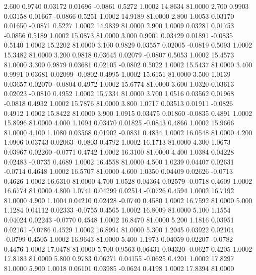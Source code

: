    2.600   0.9740   0.03172   0.01696  -0.0861   0.5272   1.0002  14.8634  81.0000
   2.700   0.9903   0.03158   0.01667  -0.0866   0.5251   1.0002  14.9189  81.0000
   2.800   1.0053   0.03170   0.01650  -0.0871   0.5227   1.0002  14.9839  81.0000
   2.900   1.0009   0.03281   0.01753  -0.0856   0.5189   1.0002  15.0873  81.0000
   3.000   0.9901   0.03429   0.01891  -0.0835   0.5140   1.0002  15.2202  81.0000
   3.100   0.9829   0.03557   0.02005  -0.0819   0.5093   1.0002  15.3482  81.0000
   3.200   0.9818   0.03645   0.02079  -0.0807   0.5053   1.0002  15.4573  81.0000
   3.300   0.9879   0.03681   0.02105  -0.0802   0.5022   1.0002  15.5437  81.0000
   3.400   0.9991   0.03681   0.02099  -0.0802   0.4995   1.0002  15.6151  81.0000
   3.500   1.0139   0.03657   0.02070  -0.0804   0.4972   1.0002  15.6774  81.0000
   3.600   1.0320   0.03613   0.02023  -0.0810   0.4952   1.0002  15.7334  81.0000
   3.700   1.0516   0.03562   0.01968  -0.0818   0.4932   1.0002  15.7876  81.0000
   3.800   1.0717   0.03513   0.01911  -0.0826   0.4912   1.0002  15.8422  81.0000
   3.900   1.0915   0.03475   0.01860  -0.0835   0.4891   1.0002  15.8996  81.0000
   4.000   1.1094   0.03470   0.01825  -0.0843   0.4866   1.0002  15.9666  81.0000
   4.100   1.1080   0.03568   0.01902  -0.0831   0.4834   1.0002  16.0548  81.0000
   4.200   1.0906   0.03743   0.02063  -0.0803   0.4792   1.0002  16.1713  81.0000
   4.300   1.0673   0.03967   0.02260  -0.0771   0.4742   1.0002  16.3100  81.0000
   4.400   1.0384   0.04228   0.02483  -0.0735   0.4689   1.0002  16.4558  81.0000
   4.500   1.0239   0.04407   0.02631  -0.0714   0.4648   1.0002  16.5707  81.0000
   4.600   1.0350   0.04409   0.02626  -0.0713   0.4626   1.0002  16.6310  81.0000
   4.700   1.0528   0.04364   0.02579  -0.0718   0.4609   1.0002  16.6774  81.0000
   4.800   1.0741   0.04299   0.02514  -0.0726   0.4594   1.0002  16.7192  81.0000
   4.900   1.1004   0.04210   0.02428  -0.0740   0.4580   1.0002  16.7592  81.0000
   5.000   1.1284   0.04112   0.02333  -0.0755   0.4565   1.0002  16.8009  81.0000
   5.100   1.1554   0.04024   0.02243  -0.0770   0.4548   1.0002  16.8470  81.0000
   5.200   1.1816   0.03951   0.02161  -0.0786   0.4529   1.0002  16.8994  81.0000
   5.300   1.2045   0.03922   0.02104  -0.0799   0.4505   1.0002  16.9643  81.0000
   5.400   1.1973   0.04059   0.02207  -0.0782   0.4476   1.0002  17.0478  81.0000
   5.700   0.9563   0.06431   0.04320  -0.0627   0.4205   1.0002  17.8183  81.0000
   5.800   0.9783   0.06271   0.04155  -0.0625   0.4201   1.0002  17.8297  81.0000
   5.900   1.0018   0.06101   0.03985  -0.0624   0.4198   1.0002  17.8394  81.0000

